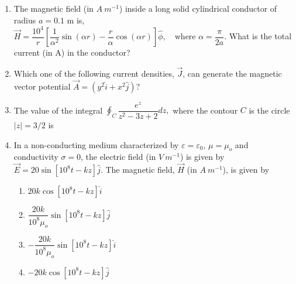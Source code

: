 \documentclass[14pt, a4paper]{extarticle}
\begin{document}
\begin{enumerate}[label=\textbf{Q. \arabic*}, start=21]

\item The magnetic field (in $A~m^{-1}$) inside a long solid cylindrical conductor of radius $a = 0.1$ m is,
$ \vec{H} = \dfrac{10^4}{r} \left[ \dfrac{1}{\alpha^2}\sin(\alpha r) - \dfrac{r}{\alpha}\cos(\alpha r) \right] \hat{\phi}, \quad \text{where } \alpha = \dfrac{\pi}{2a}. $
What is the total current (in A) in the conductor?
\begin{enumerate}
\end{enumerate}

\item Which one of the following current densities, $\vec{J}$, can generate the magnetic vector potential $\vec{A} = (y^2\hat{i} + x^2\hat{j})$?
\begin{enumerate}
\end{enumerate}

\item The value of the integral $\oint_C \dfrac{e^z}{z^2 - 3z + 2} dz,$
where the contour $C$ is the circle $|z| = 3/2$ is
\begin{enumerate}
\end{enumerate}

\item In a non-conducting medium characterized by $\varepsilon = \varepsilon_0$, $\mu = \mu_o$ and conductivity $\sigma = 0$, the electric field (in $V~m^{-1}$) is given by $\vec{E} = 20\sin[10^8 t - kz] \hat{j}$. The magnetic field, $\vec{H}$ (in $A~m^{-1}$), is given by
\begin{enumerate}
\item $20k \cos[10^8 t - kz] \hat{i}$
\item $\dfrac{20k}{10^8 \mu_o}\sin[10^8 t - kz] \hat{j}$
\item $-\dfrac{20k}{10^8 \mu_o}\sin[10^8 t - kz] \hat{i}$
\item $-20k \cos[10^8 t - kz] \hat{j}$
\end{enumerate}


\end{enumerate}
\end{document}
